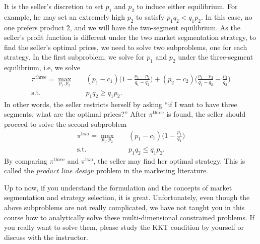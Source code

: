 \documentclass[12pt,a4paper]{article}
\begin{document}
It is the seller's discretion to set $p_1$ and $p_2$ to induce either equilibrium. 
For example, he may set an extremely high $p_2$ to satisfy $p_1 q_2 < q_1 p_2$. 
In this case, no one prefers product 2, and we will have the two-segment equilibrium. 
As the seller's profit function is different under the two market segmentation
strategy, to find the seller's optimal prices, we need to solve two subproblems, 
one for each strategy. In the first subproblem, we solve for $p_1$ and $p_2$ 
under the three-segment equilibrium, i.e, we solve 
\[\begin{split}
	\pi^{\mathrm{three}} = \max_{p_1, p_2} \quad & 
		(p_1 - c_1)\bigg(1 - \frac{p_1 - p_2}{q_1 - q_2}\bigg)
		+ (p_2 - c_2)\bigg(\frac{p_1 - p_2}{q_1 - q_2} - \frac{p_2}{q_2}\bigg) \\
	\mbox{s.t.} \quad & p_1q_2 \geq q_1p_2. 
\end{split}\]
In other words, the seller restricts herself by asking ``if I want to have 
three segments, what are the optimal prices?'' After $\pi^{\mathrm{three}}$ is found, 
the seller should proceed to solve the second subproblem
\[\begin{split}
	\pi^{\mathrm{two}} = \max_{p_1, p_2} \quad & 
		(p_1 - c_1)\bigg(1 - \frac{p_1}{q_1}\bigg) \\
	\mbox{s.t.} \quad & p_1q_2 \leq q_1p_2. 
\end{split}\]
By comparing $\pi^{\mathrm{three}}$ and $\pi^{\mathrm{two}}$, the seller may 
find her optimal strategy. This is called the \textit{product line design} 
problem in the marketing literature. 

Up to now, if you understand the formulation and the concepts of market segmentation
and strategy selection, it is great. Unfortunately, even though the above 
subproblems are not really complicated, we have not taught you in this course 
how to analytically solve these multi-dimensional constrained problems. 
If you really want to solve them, please study the KKT condition by yourself 
or discuss with the instructor. 
\end{document}
